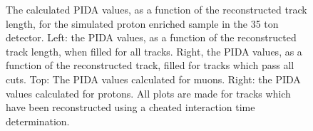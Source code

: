 \begin{figure}
\begin{subfigure}{0.48\textwidth}
        \label{fig:CRY_PIDATrLen_Proton_End}
  \end{subfigure}
  \caption[The calculated PIDA values, as a function of the reconstructed track length, for the simulated proton enriched sample in the 35 ton detector]
          {The calculated PIDA values, as a function of the reconstructed track length, for the simulated proton enriched sample in the 35 ton detector. Left: the PIDA values, as a function of the reconstructed track length, when filled for all tracks. Right, the PIDA values, as a function of the reconstructed track, filled for tracks which pass all cuts. Top: The PIDA values calculated for muons. Right: the PIDA values calculated for protons. All plots are made for tracks which have been reconstructed using a cheated interaction time determination.}
  \label{fig:CRY_PIDATrLen_PIDA}
\end{figure}

